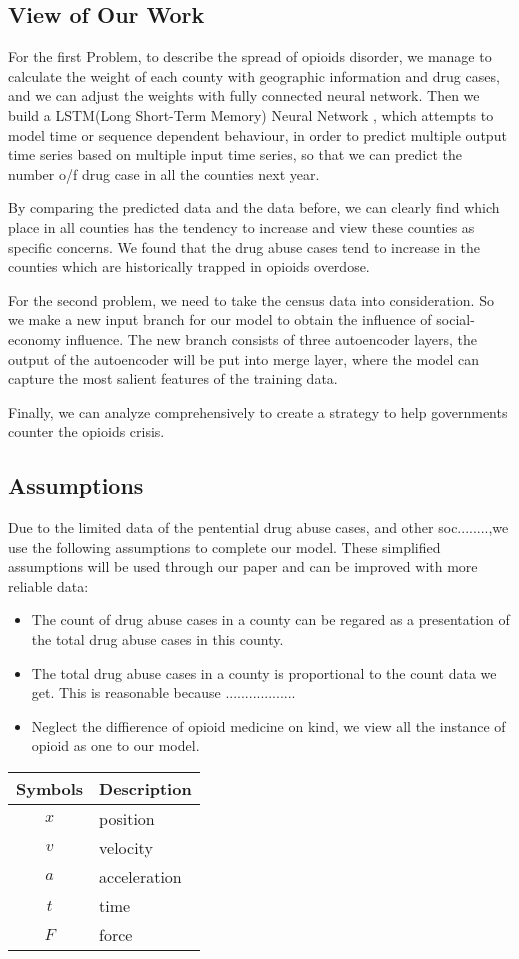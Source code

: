 \documentclass{mcmthesis}
\begin{document}
	\subsection{View of Our Work}
		\par For the first Problem, to describe the spread of opioids disorder, we manage to calculate the weight of each county with geographic information and drug cases, and we can adjust the weights with fully connected neural network. Then we build a LSTM(Long Short-Term Memory) Neural Network , which attempts to model time or sequence dependent behaviour, in order to predict multiple output time series based on multiple input time series, so that we can predict the number o/f drug case in all the counties next year.
		\par By comparing the predicted data and the data before, we can clearly find which place in all counties has the tendency to increase and view these counties as specific concerns. We found that the drug abuse cases tend to increase in the counties which are historically trapped in opioids overdose.		
		\par For the second problem, we need to take the census data into consideration. So we make a new input branch for our model to obtain the influence of social-economy influence. The new branch consists of three autoencoder layers, the output of the autoencoder will be put into merge layer, where the model can capture the most salient features of the training data.	
		\par Finally, we can analyze comprehensively to create a strategy to help governments counter the opioids crisis.
	\subsection{Assumptions}

		\par Due to the limited data of the pentential drug abuse cases, and other soc........,we use the
		following assumptions to complete our model. These simplified assumptions will be used through our paper and can be improved with more reliable data:
		\begin{itemize}
			\item The count of drug abuse cases in a county can be regared as a presentation of the total drug abuse cases in this county.
			\item The total drug abuse cases in a county is proportional to the count data we get. This is reasonable because ..................
			\item Neglect the diffierence of opioid medicine on kind, we view all the instance of opioid as one to our model.
		\end{itemize}
\begin{tabular}{cp{}}
	\toprule
	 Symbols & Description\\
	\midrule
	 $x$ & position \\
	 $v$ & velocity \\
	 $a$ & acceleration \\
	 $t$ & time \\
	 $F$ & force\\
	\bottomrule
\end{tabular}
\end{document}
